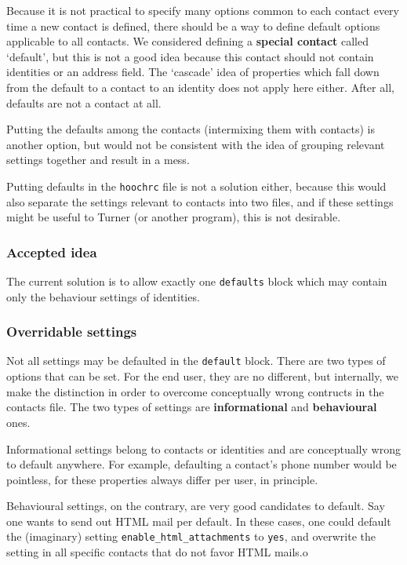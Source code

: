 \documentclass[a4paper]{article}
\begin{document}
Because it is not practical to specify many options common to each
contact every time a new contact is defined, there should be a way to
define default options applicable to all contacts.  We considered
defining a \textbf{special contact} called `default', but this is not a
good idea because this contact should not contain identities or an
address field.  The `cascade' idea of properties which fall down from
the default to a contact to an identity does not apply here either.
After all, defaults are not a contact at all.

Putting the defaults among the contacts (intermixing them with contacts)
is another option, but would not be consistent with the idea of grouping
relevant settings together and result in a mess.

Putting defaults in the \texttt{hoochrc} file is not a solution either,
because this would also separate the settings relevant to contacts into
two files, and if these settings might be useful to Turner (or another
program), this is not desirable.

\subsubsection{Accepted idea}

The current solution is to allow exactly one \texttt{defaults} block
which may contain only the behaviour settings of identities.

\subsubsection{Overridable settings}

Not all settings may be defaulted in the \texttt{default} block.  There
are two types of options that can be set.  For the end user, they are no
different, but internally, we make the distinction in order to overcome
conceptually wrong contructs in the contacts file.  The two types of
settings are \textbf{informational} and \textbf{behavioural} ones.

Informational settings belong to contacts or identities and are
conceptually wrong to default anywhere.  For example, defaulting a
contact's phone number would be pointless, for these properties always
differ per user, in principle.

Behavioural settings, on the contrary, are very good candidates to
default.  Say one wants to send out HTML mail per default.  In these
cases, one could default the (imaginary) setting
\texttt{enable\_html\_attachments} to \texttt{yes}, and overwrite the
setting in all specific contacts that do not favor HTML mails.o
\end{document}
